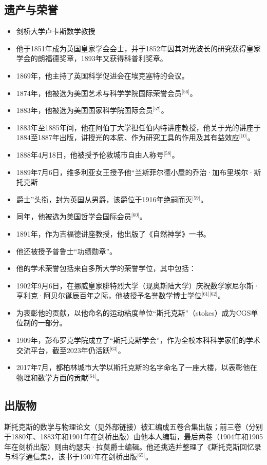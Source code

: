 \subsection{遗产与荣誉}
\begin{itemize}
\item 剑桥大学卢卡斯数学教授
\item 他于1851年成为英国皇家学会会士，并于1852年因其对光波长的研究获得皇家学会的朗福德奖章，1893年又获得科普利奖章。
\item 1869年，他主持了英国科学促进会在埃克塞特的会议。
\item 1874年，他被选为美国艺术与科学学院国际荣誉会员\(^\text{[56]}\)。
\item 1883年，他被选为美国国家科学院国际会员\(^\text{[57]}\)。
\item 1883年至1885年间，他在阿伯丁大学担任伯内特讲座教授，他关于光的讲座于1884至1887年出版，讲授光的本质、作为研究工具的作用及其有益效应\(^\text{[10]}\)。
\item 1888年4月18日，他被授予伦敦城市自由人称号\(^\text{[58]}\)。
\item 1889年7月6日，维多利亚女王授予他“兰斯菲尔德小屋的乔治·加布里埃尔·斯托克斯\item 爵士”头衔，封为英国从男爵，该爵位于1916年绝嗣而灭\(^\text{[59]}\)。
\item 同年，他被选为美国哲学会国际会员\(^\text{[60]}\)。
\item 1891年，作为吉福德讲座教授，他出版了《自然神学》一书。
\item 他还被授予普鲁士“功绩勋章”。
\item 他的学术荣誉包括来自多所大学的荣誉学位，其中包括：
\item 1902年9月6日，在挪威皇家腓特烈大学（现奥斯陆大学）庆祝数学家尼尔斯·亨利克·阿贝尔诞辰百年之际，他被授予名誉数学博士学位\(^\text{[61][62]}\)。
\item 为表彰他的贡献，以他命名的运动粘度单位“斯托克斯”（stokes）成为CGS单位制的一部分。
\item 1909年，彭布罗克学院成立了“斯托克斯学会”，作为全校本科科学家们的学术交流平台，截至2023年仍活跃\(^\text{[63]}\)。
\item 2017年7月，都柏林城市大学以斯托克斯的名字命名了一座大楼，以表彰他在物理和数学方面的贡献\(^\text{[64]}\)。
\end{itemize}
\subsection{出版物}
斯托克斯的数学与物理论文（见外部链接）被汇编成五卷合集出版；前三卷（分别于1880年、1883年和1901年在剑桥出版）由他本人编辑，最后两卷（1904年和1905年在剑桥出版）则由约瑟夫·拉莫爵士编辑。他还挑选并整理了《斯托克斯回忆录与科学通信集》，该书于1907年在剑桥出版\(^\text{[65]}\)。
